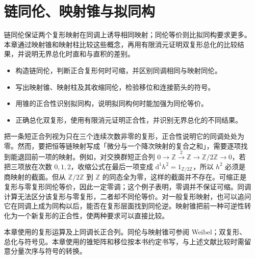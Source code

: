 
\chapter{链同伦、映射锥与拟同构}
\label{b4:ch:06}

\begin{chapterabstract}
	链同伦保证两个复形映射在同调上诱导相同映射；同伦等价则比拟同构要求更多。本章通过映射锥和映射柱比较这些概念，再用有限消元证明双复形总化的比较结果，并说明无界总化时直和与直积的差别。
\end{chapterabstract}

\begin{learninggoals}
	\begin{itemize}
		\item 构造链同伦，判断正合复形何时可缩，并区别同调相同与映射同伦。
		\item 写出映射锥、映射柱及其收缩同伦，检验移位和连接箭头的符号。
		\item 用锥的正合性识别拟同构，说明拟同构何时能加强为同伦等价。
		\item 正确总化双复形，使用有限消元证明正合性，并识别无界总化的不同结果。
	\end{itemize}
\end{learninggoals}

把一条短正合列视为只在三个连续次数非零的复形，正合性说明它的同调处处为零。然而，要把恒等链映射写成「微分与一个降次映射的复合之和」，需要逐项找到能退回前一项的映射。例如，对交换群短正合列 \(0\rightarrow\mathbb Z\xrightarrow{2}\mathbb Z\rightarrow\mathbb Z/2\mathbb Z\rightarrow0\)，若把三项放在次数 \(0,1,2\)，收缩公式在最后一项变成 \(\mathrm{d}^1h^2=1_{\mathbb Z/2\mathbb Z}\)，所以 \(h^2\) 必须是商映射的截面。但从 \(\mathbb Z/2\mathbb Z\) 到 \(\mathbb Z\) 的同态全为零，这样的截面并不存在。可缩正是复形与零复形同伦等价，因此一定零调；这个例子表明，零调并不保证可缩。同调计算无法区分该复形与零复形，二者却不同伦等价。对一般复形映射，也可以追问它在同调上成为同构以后，能否在复形层面找到同伦逆。映射锥把前一种可逆性转化为一个新复形的正合性，使两种要求可以直接比较。

\ProseParagraphBreak
本章使用的复形运算及上同调长正合列。同伦与映射锥可参阅 Weibel\cite[Section 1.4, Lemma 1.4.5; Section 1.5, Lemma 1.5.3, Corollary 1.5.4]{Weibel1994HomologicalAlgebra}；双复形、总化与符号见\cite[Example 1.2.4, Sign Trick 1.2.5, Total Complexes 1.2.6]{Weibel1994HomologicalAlgebra}。本章使用的锥矩阵和移位按本书约定书写，与上述文献比较时需留意分量次序与符号的转换。

